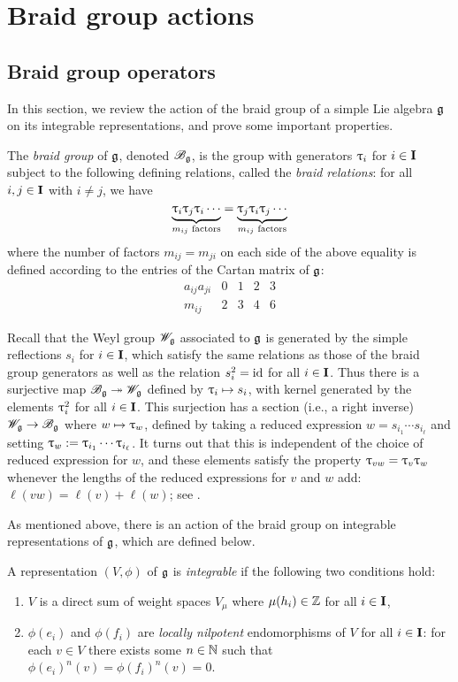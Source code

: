 \chapter{Braid group actions}\label{chap:braidgroup}

\section{Braid group operators}\label{sec:braid}

In this section, we review the action of the braid group of a simple Lie algebra $\mathfrak{g}$ on its integrable representations, and prove some important properties.

The \emph{braid group} of $\mathfrak{g}$, denoted $\mathscr{B}_{\mathfrak{g}}$, is the group with generators $\uptau_i$ for $i\in\mathbf{I}$ subject to the following defining relations, called the \emph{braid relations}: for all $i,j\in\mathbf{I}$ with $i\neq j$, we have
\[\underbrace{\uptau_i\uptau_j\uptau_i\cdots}_{m_{ij}\text{ factors}} = \underbrace{\uptau_j\uptau_i\uptau_j\cdots}_{m_{ij}\text{ factors}}\]
where the number of factors $m_{ij}=m_{ji}$ on each side of the above equality is defined according to the entries of the Cartan matrix of $\mathfrak{g}$:
\[\begin{array}{c|cccc}
    a_{ij}a_{ji} & 0 & 1 & 2 & 3 \\
    \hline
    m_{ij} & 2 & 3 & 4 & 6
\end{array}\]

Recall that the Weyl group $\mathscr{W}_{\mathfrak{g}}$ associated to $\mathfrak{g}$ is generated by the simple reflections $s_i$ for $i\in\mathbf{I}$, which satisfy the same relations as those of the braid group generators as well as the relation $s_i^2={\operatorname{id}}$ for all $i\in\mathbf{I}$.
Thus there is a surjective map $\mathscr{B}_{\mathfrak{g}}\twoheadrightarrow\mathscr{W}_{\mathfrak{g}}$ defined by $\uptau_i\mapsto s_i$, with kernel generated by the elements $\uptau_i^2$ for all $i\in\mathbf{I}$.
This surjection has a section (i.e., a right inverse) $\mathscr{W}_{\mathfrak{g}}\to\mathscr{B}_{\mathfrak{g}}$ where $w\mapsto\uptau_w$, defined by taking a reduced expression $w=s_{i_1}\cdots s_{i_\ell}$ and setting $\uptau_w:=\uptau_{i_1}\cdots\uptau_{i_\ell}$.
It turns out that this is independent of the choice of reduced expression for $w$, and these elements satisfy the property $\uptau_{vw}=\uptau_v\uptau_w$ whenever the lengths of the reduced expressions for $v$ and $w$ add: $\ell(vw)=\ell(v)+\ell(w)$; see \cite[\S2.1.2]{lusztig_introduction_2010}.

As mentioned above, there is an action of the braid group on integrable representations of $\mathfrak{g}$, which are defined below.

\begin{definition}\label{D:integrable}
    A representation $(V,\phi)$ of $\mathfrak{g}$ is \emph{integrable} if the following two conditions hold:
    \begin{enumerate}
        \item $V$ is a direct sum of weight spaces $V_\mu$ where $\mu(h_i)\in\mathbb{Z}$ for all $i\in\mathbf{I}$,
        \item $\phi(e_i)$ and $\phi(f_i)$ are \emph{locally nilpotent} endomorphisms of $V$ for all $i\in\mathbf{I}$: for each $v\in V$ there exists some $n\in\mathbb{N}$ such that $\phi(e_i)^n(v)=\phi(f_i)^n(v)=0$.
    \end{enumerate}
\end{definition}


